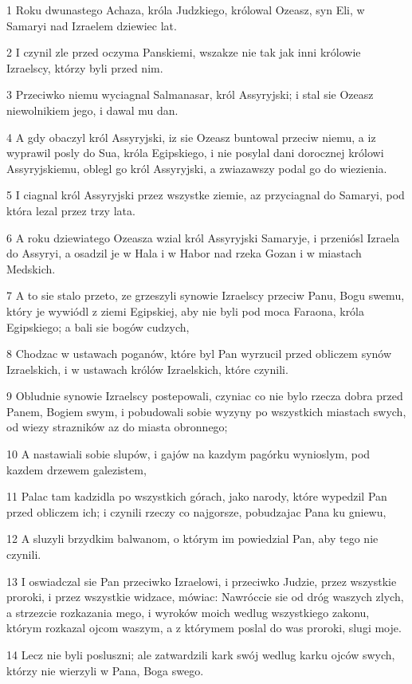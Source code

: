 \par 1 Roku dwunastego Achaza, króla Judzkiego, królowal Ozeasz, syn Eli, w Samaryi nad Izraelem dziewiec lat.
\par 2 I czynil zle przed oczyma Panskiemi, wszakze nie tak jak inni królowie Izraelscy, którzy byli przed nim.
\par 3 Przeciwko niemu wyciagnal Salmanasar, król Assyryjski; i stal sie Ozeasz niewolnikiem jego, i dawal mu dan.
\par 4 A gdy obaczyl król Assyryjski, iz sie Ozeasz buntowal przeciw niemu, a iz wyprawil posly do Sua, króla Egipskiego, i nie posylal dani dorocznej królowi Assyryjskiemu, oblegl go król Assyryjski, a zwiazawszy podal go do wiezienia.
\par 5 I ciagnal król Assyryjski przez wszystke ziemie, az przyciagnal do Samaryi, pod która lezal przez trzy lata.
\par 6 A roku dziewiatego Ozeasza wzial król Assyryjski Samaryje, i przeniósl Izraela do Assyryi, a osadzil je w Hala i w Habor nad rzeka Gozan i w miastach Medskich.
\par 7 A to sie stalo przeto, ze grzeszyli synowie Izraelscy przeciw Panu, Bogu swemu, który je wywiódl z ziemi Egipskiej, aby nie byli pod moca Faraona, króla Egipskiego; a bali sie bogów cudzych,
\par 8 Chodzac w ustawach poganów, które byl Pan wyrzucil przed obliczem synów Izraelskich, i w ustawach królów Izraelskich, które czynili.
\par 9 Obludnie synowie Izraelscy postepowali, czyniac co nie bylo rzecza dobra przed Panem, Bogiem swym, i pobudowali sobie wyzyny po wszystkich miastach swych, od wiezy strazników az do miasta obronnego;
\par 10 A nastawiali sobie slupów, i gajów na kazdym pagórku wynioslym, pod kazdem drzewem galezistem,
\par 11 Palac tam kadzidla po wszystkich górach, jako narody, które wypedzil Pan przed obliczem ich; i czynili rzeczy co najgorsze, pobudzajac Pana ku gniewu,
\par 12 A sluzyli brzydkim balwanom, o którym im powiedzial Pan, aby tego nie czynili.
\par 13 I oswiadczal sie Pan przeciwko Izraelowi, i przeciwko Judzie, przez wszystkie proroki, i przez wszystkie widzace, mówiac: Nawróccie sie od dróg waszych zlych, a strzezcie rozkazania mego, i wyroków moich wedlug wszystkiego zakonu, którym rozkazal ojcom waszym, a z którymem poslal do was proroki, slugi moje.
\par 14 Lecz nie byli posluszni; ale zatwardzili kark swój wedlug karku ojców swych, którzy nie wierzyli w Pana, Boga swego.
